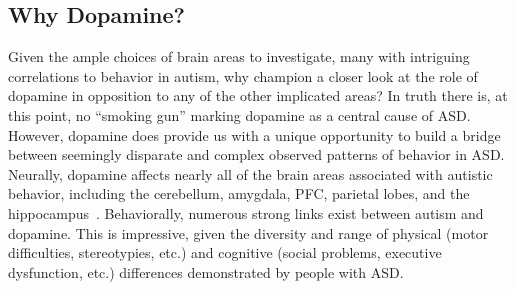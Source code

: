 \documentclass[man]{apa}
\begin{document}


\subsection{Why Dopamine?} 
Given the ample choices of brain areas to investigate, many with intriguing correlations to behavior in autism, why champion a closer look at the role of dopamine in opposition to any of the other implicated areas?  In truth there is, at this point, no ``smoking gun'' marking dopamine as a central cause of ASD.  However, dopamine does provide us with a unique opportunity to build a bridge between seemingly disparate and complex observed patterns of behavior in ASD.  Neurally, dopamine affects nearly all of the brain areas associated with autistic behavior, including the cerebellum, amygdala, PFC, parietal lobes, and the hippocampus~\cite{RefWorks:151,RefWorks:152,RefWorks:153,RefWorks:154,RefWorks:155,RefWorks:156}.  Behaviorally, numerous strong links exist between autism and dopamine.   This is impressive, given the diversity and range of physical (motor difficulties, stereotypies, etc.) and cognitive (social problems, executive dysfunction, etc.) differences demonstrated by people with ASD.  
\end{document}
